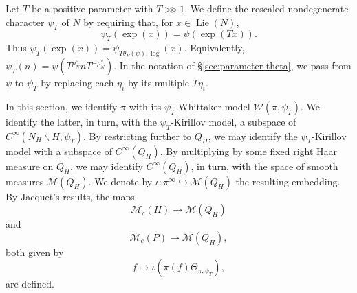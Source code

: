 \documentclass[reqno]{amsart}
\DeclareMathOperator{\Lie}{Lie}
\theoremstyle{plain} \newtheorem{theorem} {Theorem}
\theoremstyle{definition} \newtheorem{definition} [theorem] {Definition}
\theoremstyle{itplain} %
\numberwithin{equation}{section}
\numberwithin{theorem}{section}
\begin{document}
Let $T$ be a positive parameter with $T \ggg 1$.  We define the rescaled nondegenerate character $\psi_T$ of $N$ by requiring that, for $x \in \Lie(N)$,
\begin{equation*}
  \psi_T(\exp(x)) = \psi(\exp(T x)).
\end{equation*}
Thus $\psi_T(\exp(x)) = \psi_{T \theta_P(\psi), \log}(x)$.  Equivalently, $\psi_T(n) = \psi (T^{\rho_N^\vee} n T^{-\rho_N^\vee})$.  In the notation of \S\ref{sec:parameter-theta}, we pass from $\psi$ to $\psi_T$ by replacing each $\eta_i$ by its multiple $T \eta_i$.

In this section, we identify $\pi$ with its $\psi_T$-Whittaker model $\mathcal{W}(\pi,\psi_T)$.  We identify the latter, in turn, with the $\psi_T$-Kirillov model, a subspace of $C^\infty(N_H \backslash H, \psi_T)$.  By restricting further to $Q_H$, we may identify the $\psi_T$-Kirillov model with a subspace of $C^\infty(Q_H)$.  By multiplying by some fixed right Haar measure on $Q_H$, we may identify $C^\infty(Q_H)$, in turn, with the space of smooth measures $\mathcal{M}(Q_H)$.  We denote by $\iota : \pi^\infty \hookrightarrow \mathcal{M}(Q_H)$ the resulting embedding.  By Jacquet's results, the maps
\begin{equation}\label{eq:mathc-right-mathc}
  \mathcal{M}_c(H) \rightarrow \mathcal{M}(Q_H)
\end{equation}
and
\begin{equation*}
  \mathcal{M}_c(P) \rightarrow \mathcal{M}(Q_H),
\end{equation*}
both given by
\begin{equation*}
  f \mapsto \iota(\pi(f) \Theta_{\pi,\psi_T}),
\end{equation*}
are defined.
\end{document}
